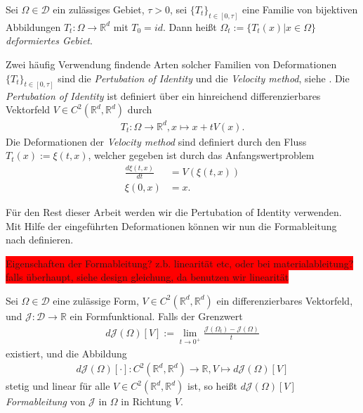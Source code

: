 \begin{defi}
Sei $\Omega\in\mathcal{D}$ ein zulässiges Gebiet, $\tau > 0$, sei $\{T_t\}_{t\in [0,\tau]}$ eine Familie von bijektiven Abbildungen $T_t: \Omega \rightarrow \mathbb{R}^d$ mit $T_0 = id$. Dann heißt $\Omega_t := \{T_t(x) \vert x\in\Omega\}$ \textit{deformiertes Gebiet}.
\end{defi}

Zwei häufig Verwendung findende Arten solcher Familien von Deformationen $\{T_t\}_{t\in [0,\tau]}$ sind die \textit{Pertubation of Identity} und die \textit{Velocity method}, siehe \cite{bfgs2}. Die \textit{Pertubation of Identity} ist definiert über ein hinreichend differenzierbares Vektorfeld $V \in C^2(\mathbb{R}^d,\mathbb{R}^d)$ durch
\begin{align*}
	T_t: \Omega \rightarrow \mathbb{R}^d, x \mapsto x + tV(x).
\end{align*}
Die Deformationen der \textit{Velocity method} sind definiert durch den Fluss $T_t(x) := \xi(t,x)$, welcher gegeben ist durch das Anfangswertproblem
\begin{align*}
	\frac{d\xi(t,x)}{dt} &= V(\xi(t,x))\\
	\xi(0,x) 		&= x.
\end{align*}

Für den Rest dieser Arbeit werden wir die Pertubation of Identity verwenden. Mit Hilfe der eingeführten Deformationen können wir nun die Formableitung nach \cite{bfgs2} definieren. 

\colorbox{red}{Eigenschaften der Formableitung? z.b. linearität etc, oder bei materialableitung? falls überhaupt, siehe design gleichung, da benutzen wir linearität}

\begin{defi}[Formableitung]
Sei $\Omega \in \mathcal{D}$ eine zulässige Form, $V\in C^2(\mathbb{R}^d,\mathbb{R}^d)$ ein differenzierbares Vektorfeld, und $\mathcal{J}: \mathcal{D} \rightarrow \mathbb{R}$ ein Formfunktional. Falls der Grenzwert
\begin{align*}
	d\mathcal{J}(\Omega)[V] := \underset{t \rightarrow 0^+}{\lim}
	\frac{\mathcal{J}(\Omega_t) - \mathcal{J}(\Omega)}{t}
\end{align*}
existiert, und die Abbildung 
\begin{align*}
	d\mathcal{J}(\Omega)[\cdot]: C^2(\mathbb{R}^d,\mathbb{R}^d) \rightarrow 						\mathbb{R}, V \mapsto d\mathcal{J}(\Omega)[V]
\end{align*}
stetig und linear für alle $V \in C^2(\mathbb{R}^d,\mathbb{R}^d)$ ist, so heißt $d\mathcal{J}(\Omega)[V]$ \textit{Formableitung} von $\mathcal{J}$ in $\Omega$ in Richtung $V$.
\end{defi}

